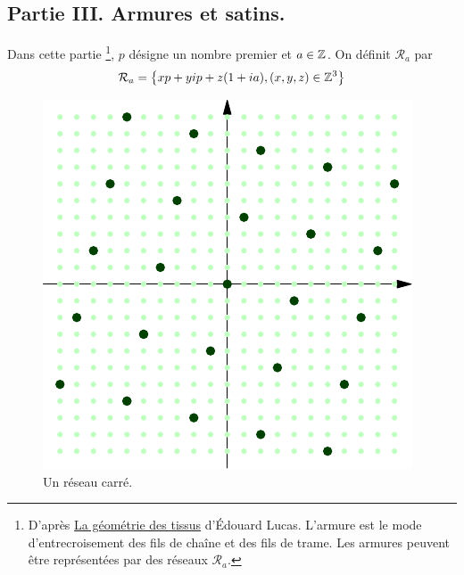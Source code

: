 \subsection*{Partie III. Armures et satins.}
Dans cette partie \footnote{D'après \href{http://www.math.ens.fr/culturemath/histoire\%20des\%20maths/pdf/Decaillot\_textile.pdf}{La géométrie des tissus} d'\'Edouard Lucas. L'armure est le mode d'entrecroisement des fils de chaîne et des fils de trame. Les armures peuvent être représentées par des réseaux $\mathcal{R}_a$.}, $p$ désigne un nombre premier et $a\in \mathbb{Z}$. On définit $\mathcal{R}_a$ par
\begin{displaymath}
\mathcal{R}_a = \left\lbrace  xp + yip + z(1+ia), (x,y,z)\in \mathbb{Z}^3 \right\rbrace  
\end{displaymath}
\begin{figure}[h]
  \centering
  \includegraphics{./Eari2car_2.pdf}
  \caption{Un réseau carré.}
  \label{fig:Eari2car_2}
\end{figure}

